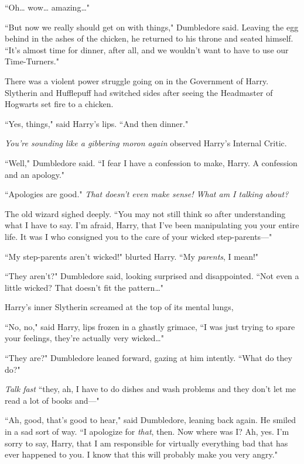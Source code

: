 ``Oh{\ldots} wow{\ldots} amazing{\ldots}"

``But now we really should get on with things," Dumbledore said. Leaving the egg behind in the ashes of the chicken, he returned to his throne and seated himself. ``It's almost time for dinner, after all, and we wouldn't want to have to use our Time-Turners."

There was a violent power struggle going on in the Government of Harry. Slytherin and Hufflepuff had switched sides after seeing the Headmaster of Hogwarts set fire to a chicken.

``Yes, things," said Harry's lips. ``And then dinner."

\emph{You're sounding like a gibbering moron again} observed Harry's Internal Critic.

``Well," Dumbledore said. ``I fear I have a confession to make, Harry. A confession and an apology."

``Apologies are good." \emph{That doesn't even make sense! What am I talking about?}

The old wizard sighed deeply. ``You may not still think so after understanding what I have to say. I'm afraid, Harry, that I've been manipulating you your entire life. It was I who consigned you to the care of your wicked step-parents—"

``My step-parents aren't wicked!" blurted Harry. ``My \emph{parents}, I mean!"

``They aren't?" Dumbledore said, looking surprised and disappointed. ``Not even a little wicked? That doesn't fit the pattern{\ldots}"

Harry's inner Slytherin screamed at the top of its mental lungs, \emph{}

``No, no," said Harry, lips frozen in a ghastly grimace, ``I was just trying to spare your feelings, they're actually very wicked{\ldots}"

``They are?" Dumbledore leaned forward, gazing at him intently. ``What do they do?"

\emph{Talk fast} ``they, ah, I have to do dishes and wash problems and they don't let me read a lot of books and—"

``Ah, good, that's good to hear," said Dumbledore, leaning back again. He smiled in a sad sort of way. ``I apologize for \emph{that}, then. Now where was I? Ah, yes. I'm sorry to say, Harry, that I am responsible for virtually everything bad that has ever happened to you. I know that this will probably make you very angry."

